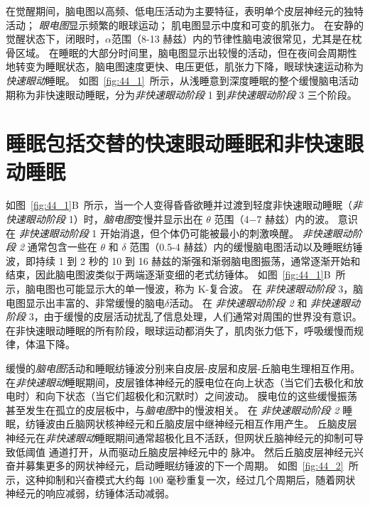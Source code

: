 在觉醒期间，脑电图以高频、低电压活动为主要特征，表明单个皮层神经元的独特活动；
\textit{眼电图}显示频繁的眼球运动；
肌电图显示中度和可变的肌张力。
在安静的觉醒状态下，闭眼时，$ \alpha $范围（8-13 赫兹）内的节律性脑电波很常见，尤其是在枕骨区域。
在睡眠的大部分时间里，脑电图显示出较慢的活动，但在夜间会周期性地转变为睡眠状态，脑电图速度更快、电压更低，肌张力下降，眼球快速运动称为\textit{快速眼动}睡眠。
如图~\ref{fig:44_1}~所示，从浅睡意到深度睡眠的整个缓慢脑电活动期称为非快速眼动睡眠，分为\textit{非快速眼动阶段} 1 到\textit{非快速眼动阶段} 3 三个阶段。



\section{睡眠包括交替的快速眼动睡眠和非快速眼动睡眠}

如图~\ref{fig:44_1}B~所示，当一个人变得昏昏欲睡并过渡到轻度非快速眼动睡眠（\textit{非快速眼动阶段} 1）时，\textit{脑电图}变慢并显示出在 $ \theta $ 范围（4−7 赫兹）内的波。
意识在 \textit{非快速眼动阶段} 1 开始消退，但个体仍可能被最小的刺激唤醒。
\textit{非快速眼动阶段 2} 通常包含一些在 $ \theta $ 和 $ \delta $ 范围（0.5-4 赫兹）内的缓慢脑电图活动以及睡眠纺锤波，即持续 1 到 2 秒的 10 到 16 赫兹的渐强和渐弱脑电图振荡，通常逐渐开始和结束，因此脑电图波类似于两端逐渐变细的老式纺锤体。
如图~\ref{fig:44_1}B~所示，脑电图也可能显示大的单一慢波，称为 K-复合波。
在 \textit{非快速眼动阶段} 3，脑电图显示出丰富的、非常缓慢的脑电$\delta$活动。
在 \textit{非快速眼动阶段 2} 和 \textit{非快速眼动阶段} 3，由于缓慢的皮层活动扰乱了信息处理，人们通常对周围的世界没有意识。
在非快速眼动睡眠的所有阶段，眼球运动都消失了，肌肉张力低下，呼吸缓慢而规律，体温下降。


缓慢的\textit{脑电图}活动和睡眠纺锤波分别来自皮层-皮层和皮层-丘脑电生理相互作用。
在\textit{非快速眼动}睡眠期间，皮层锥体神经元的膜电位在向上状态（当它们去极化和放电时）和向下状态（当它们超极化和沉默时）之间波动。
膜电位的这些缓慢振荡甚至发生在孤立的皮层板中，与\textit{脑电图}中的慢波相关。
在 \textit{非快速眼动阶段 2} 睡眠，纺锤波由丘脑网状核神经元和丘脑皮层中继神经元相互作用产生。
丘脑皮层神经元在\textit{非快速眼动}睡眠期间通常超极化且不活跃，但网状丘脑神经元的抑制可导致低阈值  通道打开，从而驱动丘脑皮层神经元中的  脉冲。
然后丘脑皮层神经元兴奋并募集更多的网状神经元，启动睡眠纺锤波的下一个周期。
如图~\ref{fig:44_2}~所示，这种抑制和兴奋模式大约每 100 毫秒重复一次，经过几个周期后，随着网状神经元的响应减弱，纺锤体活动减弱。


